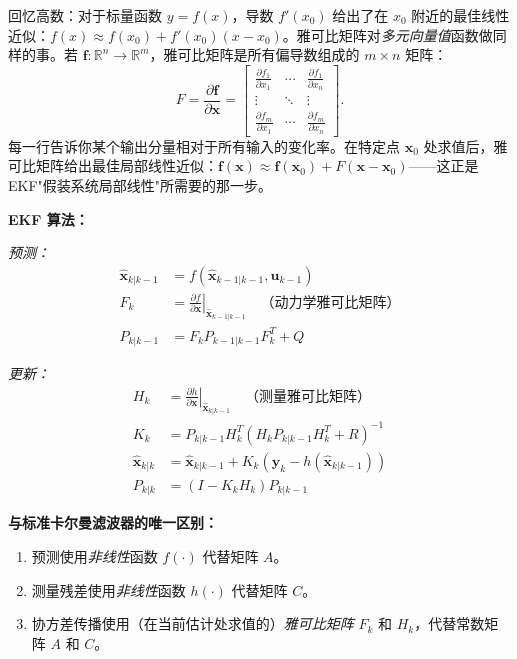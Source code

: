 回忆高数：对于标量函数 $y = f(x)$，导数 $f'(x_0)$ 给出了在 $x_0$ 附近的最佳线性近似：$f(x) \approx f(x_0) + f'(x_0)(x - x_0)$。雅可比矩阵对\emph{多元向量值}函数做同样的事。若 $\mathbf{f}: \mathbb{R}^n \to \mathbb{R}^m$，雅可比矩阵是所有偏导数组成的 $m \times n$ 矩阵：
\[
F = \frac{\partial \mathbf{f}}{\partial \mathbf{x}} = \begin{bmatrix}
\frac{\partial f_1}{\partial x_1} & \cdots & \frac{\partial f_1}{\partial x_n} \\
\vdots & \ddots & \vdots \\
\frac{\partial f_m}{\partial x_1} & \cdots & \frac{\partial f_m}{\partial x_n}
\end{bmatrix}.
\]
每一行告诉你某个输出分量相对于所有输入的变化率。在特定点 $\mathbf{x}_0$ 处求值后，雅可比矩阵给出最佳局部线性近似：$\mathbf{f}(\mathbf{x}) \approx \mathbf{f}(\mathbf{x}_0) + F(\mathbf{x} - \mathbf{x}_0)$——这正是 EKF"假装系统局部线性"所需要的那一步。

\textbf{EKF 算法：}

\textit{预测：}
\begin{align}
\hat{\mathbf{x}}_{k|k-1} &= f(\hat{\mathbf{x}}_{k-1|k-1}, \mathbf{u}_{k-1}) \\
F_k &= \left.\frac{\partial f}{\partial \mathbf{x}}\right|_{\hat{\mathbf{x}}_{k-1|k-1}} \quad \text{（动力学雅可比矩阵）} \\
P_{k|k-1} &= F_k P_{k-1|k-1} F_k^T + Q
\end{align}

\textit{更新：}
\begin{align}
H_k &= \left.\frac{\partial h}{\partial \mathbf{x}}\right|_{\hat{\mathbf{x}}_{k|k-1}} \quad \text{（测量雅可比矩阵）} \\
K_k &= P_{k|k-1} H_k^T (H_k P_{k|k-1} H_k^T + R)^{-1} \\
\hat{\mathbf{x}}_{k|k} &= \hat{\mathbf{x}}_{k|k-1} + K_k \left(\mathbf{y}_k - h(\hat{\mathbf{x}}_{k|k-1})\right) \\
P_{k|k} &= (I - K_k H_k) P_{k|k-1}
\end{align}

\textbf{与标准卡尔曼滤波器的唯一区别：}
\begin{enumerate}
    \item 预测使用\textit{非线性}函数 $f(\cdot)$ 代替矩阵 $A$。
    \item 测量残差使用\textit{非线性}函数 $h(\cdot)$ 代替矩阵 $C$。
    \item 协方差传播使用（在当前估计处求值的）\textit{雅可比矩阵} $F_k$ 和 $H_k$，代替常数矩阵 $A$ 和 $C$。
\end{enumerate}

